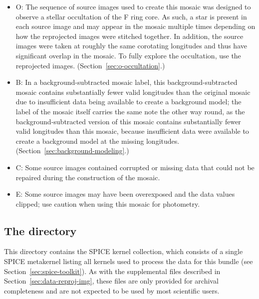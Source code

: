 \begin{itemize}
\item O: The sequence of source images used to create this mosaic was designed to observe a stellar occultation of the F ring core. As such, a star is present in each source image and may appear in the mosaic multiple times depending on how the reprojected images were stitched together. In addition, the source images were taken at roughly the same corotating longitudes and thus have significant overlap in the mosaic. To fully explore the occultation, use the reprojected images. (Section~\ref{sec:o-occultation}.)
\item B: In a background-subtracted mosaic label, this background-subtracted mosaic contains substantially fewer valid longitudes than the original mosaic due to insufficient data being available to create a background model; the label of the mosaic itself carries the same note the other way round, as the background-subtracted version of this mosaic contains substantially fewer valid longitudes than this mosaic, because insufficient data were available to create a background model at the missing longitudes. (Section~\ref{sec:background-modeling}.)
\item C: Some source images contained corrupted or missing data that could not be repaired during the construction of the mosaic.
\item E: Some source images may have been overexposed and the data values clipped; use caution when using this mosaic for photometry.
\end{itemize}

\subsection{The  directory}
\label{sec:the-spice-kernels-directory}

This directory contains the SPICE kernel collection, which consists of a single SPICE metakernel  listing all kernels used to process the data for this bundle (see Section~\ref{sec:spice-toolkit}). As with the supplemental files described in Section~\ref{sec:data-reproj-img}, these files are only provided for archival completeness and are not expected to be used by most scientific users.
